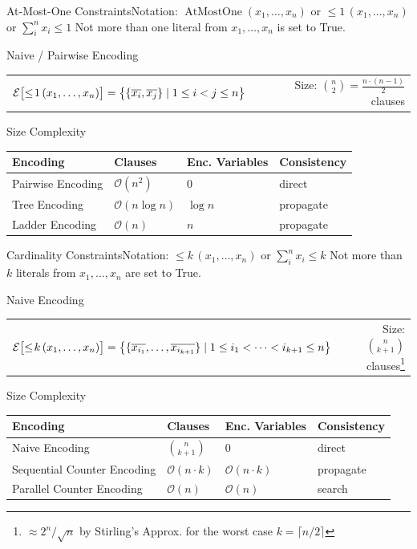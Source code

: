 \documentclass[t]{sdqbeamer}
\begin{document}
\begin{frame}{At-Most-One Constraints}{Notation: $\operatorname{AtMostOne}(x_1, \dots, x_n)$ or $\leq\!1\,(x_1, \dots, x_n)$ or $\sum_i^n x_i \leq 1$}
	Not more than one literal from $x_1, \dots, x_n$ is set to True.

	\begin{block}{Naive / Pairwise Encoding}
		\begin{tabularx}{\linewidth}{LR}
		$\mathcal{E}\bigl[\leq\!1\,(x_1, \dots, x_n)\bigr] = \bigl\{ \{\overline{x_i}, \overline{x_j} \} \mid 1 \leq i < j \leq n \bigr\}$ 
		& Size: ${n \choose 2} = \frac{n \cdot (n-1)}{2}$ clauses
		\end{tabularx}
	\end{block}
	\begin{block}{Size Complexity}
		\centering\setcolsep{10pt}
		\begin{tabularx}{\linewidth}{XlXl}
			\bf Encoding & \bf Clauses & \bf Enc. Variables & \bf Consistency \\
			\hline
			Pairwise Encoding & $\mathcal{O}(n^2)$ & 0 & direct \\
			Tree Encoding & $\mathcal{O}(n \log n)$ & $\log n$ & propagate \\
			Ladder Encoding & $\mathcal{O}(n)$ & $n$ & propagate
		\end{tabularx}
	\end{block}
\end{frame}

\begin{frame}{Cardinality Constraints}{Notation: $\leq\!k\,(x_1, \dots, x_n)$ or $\sum_i^n x_i \leq k$}
	Not more than $k$ literals from $x_1, \dots, x_n$ are set to True.
	\begin{block}{Naive Encoding}
		\begin{tabularx}{\linewidth}{lR}
			$\mathcal{E}\bigl[\leq\!k\,(x_1, \dots, x_n)\bigr] = \bigl\{ \{\overline{x_{i_1}}, \dots, \overline{x_{i_{k+1}}} \} \mid 1 \leq i_1 < \dots < i_{k+1} \leq n \bigr\}$ 
			& Size: ${n \choose k+1}$ clauses\footnote{$\approx 2^n/\sqrt{n}$ by Stirling's Approx. for the worst case $k = \lceil n/2 \rceil$}
		\end{tabularx}
	\end{block}
	\begin{block}{Size Complexity}
		\centering\setcolsep{10pt}
		\begin{tabularx}{\linewidth}{XlXl}
			\bf Encoding & \bf Clauses & \bf Enc. Variables & \bf Consistency \\
			\hline
			Naive Encoding & ${n \choose k+1}$ & 0 & direct\\
			Sequential Counter Encoding & $\mathcal{O}(n \cdot k)$ & $\mathcal{O}(n \cdot k)$ & propagate \\
			Parallel Counter Encoding & $\mathcal{O}(n)$ & $\mathcal{O}(n)$ & search
		\end{tabularx}
	\end{block}
\end{frame}
\end{document}
